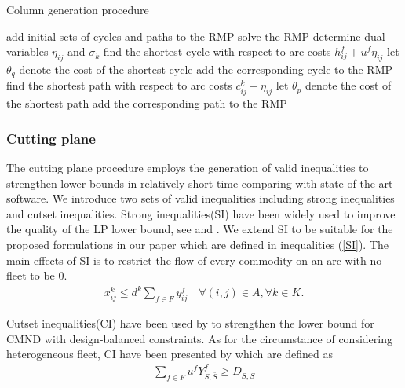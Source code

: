 \documentclass[11pt,nonblindrev,fleqn]{article}
\begin{document}
\vspace{.25in}
\begin{algorithm}[H]
\caption{Column generation procedure}\label{CG}
\LinesNumbered
\SetNlSkip{1.2em}
add initial sets of cycles and paths to the RMP\;
{
    solve the RMP\;
    determine dual variables $\eta_{ij}$ and $\sigma_k$\;
    {
        find the shortest cycle with respect to arc costs $h_{ij}^f + u^f \eta_{ij}$\;
        let $\theta_q$ denote the cost of the shortest cycle\;
        {
            add the corresponding cycle to the RMP\;
        }
    }
    {
        find the shortest path with respect to arc costs $c_{ij}^k - \eta_{ij}$\;
        let $\theta_p$ denote the cost of the shortest path\;
        {
            add the corresponding path to the RMP\;
        }
    }
}
\end{algorithm}

\subsubsection{Cutting plane}
The cutting plane procedure employs the generation of valid inequalities to strengthen lower bounds in relatively short time comparing with state-of-the-art software. We introduce two sets of valid inequalities including strong inequalities and cutset inequalities. Strong inequalities(SI) have been widely used to improve the quality of the LP lower bound, see \cite{Gendron1994RELAXATIONS,Gendron1999Multicommodity} and \cite{Chouman2015Cutting}. We extend SI to be suitable for the proposed formulations in our paper which are defined in inequalities (\ref{SI}). The main effects of SI is to restrict the flow of every commodity on an arc with no fleet to be 0.
\begin{align}\label{SI}
  x_{ij}^k \leq d^k \sum_{f\in F} y_{ij}^f      \quad       \forall (i,j)\in A, \forall k\in K.
\end{align}

Cutset inequalities(CI) have been used by \cite{Chouman2015Cutting} to strengthen the lower bound for CMND with design-balanced constraints. As for the circumstance of considering heterogeneous fleet, CI have been presented by \cite{Kim1999Multimodal} which are defined as
\begin{align}
    \sum_{f\in F}u^f Y_{S,\bar{S}}^f \geq  D_{S,\bar{S}}
\end{align}
\end{document}
